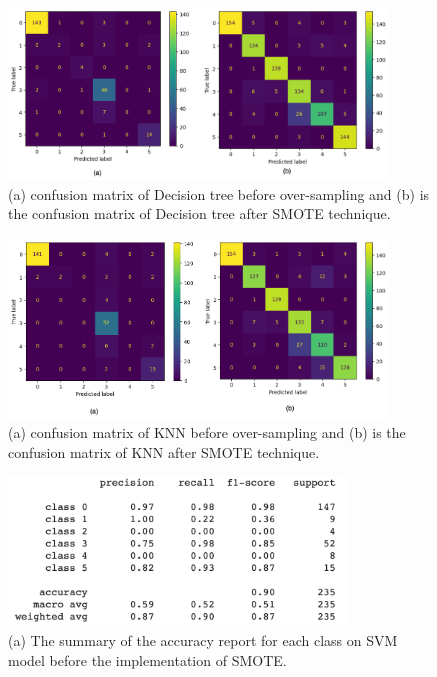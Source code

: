 \documentclass{article}
\begin{document}
\begin{figure}[h]\label{tree-conf}
\centering
\includegraphics[width=0.9\textwidth]{tree_conf.png}
\caption{(a) confusion matrix of Decision tree before over-sampling and (b) is the confusion matrix of Decision tree after SMOTE technique.}\label{fig1}
\end{figure}



\begin{figure}[h]
\centering
\includegraphics[width=0.9\textwidth]{KNN_conf.png}
\caption{(a) confusion matrix of KNN before over-sampling and (b) is the confusion matrix of KNN after SMOTE technique.}\label{knn-conf}
\end{figure}


\begin{figure}[h]
\centering
\includegraphics[width=0.8\textwidth]{SVM_b.png}
\caption{(a) The summary of the accuracy report for each class on SVM model before the implementation of SMOTE.}\label{fig1}
\label{wo-smote-svm}
\centering
\end{figure}
\end{document}
